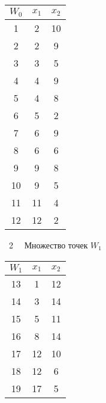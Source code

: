 \begin{multicols}{2}
{\small %
\begin{center}
\vspace*{3pt}
  \tabcolsep=17pt
  \begin{tabular}{|c|c|c|}
 \hline
   $ W_0$ & $x_1$ & $x_2$\\
   \hline
   \hphantom{9}1 & 2 &10\hphantom{9}\\
   \hphantom{9}2 & 2&9\\
   \hphantom{9}3 & 3&5\\
   \hphantom{9}4 & 4& 9\\
   \hphantom{9}5 & 4&8\\
   \hphantom{9}6 & 5&2\\
   \hphantom{9}7 & 6&9\\
   \hphantom{9}8 & 6&6\\
   \hphantom{9}9 & 9&8\\
   10 & 9&5\\
   11 & 11\hphantom{9}& 4\\
   12 &12\hphantom{9}&2 \\
\hline
\end{tabular}
\end{center}
}

\vspace*{6pt}

{ \begin{center}  %
 
\noindent
{{\tablename~2}\ \ \small{
Множество точек $W_1$
}}
\end{center}}

{\small %
\begin{center}
\vspace*{3pt}
  \tabcolsep=17pt
   \begin{tabular}{|c|c|c|}
 \hline
$W_1$ & $x_1$ & $x_2$\\
\hline
13 & \hphantom{9}1&12\\
14 & \hphantom{9}3& 14\\
15 & \hphantom{9}5& 11\\
16 & \hphantom{9}8&14\\
17 & 12&10\\
18 & 12& \hphantom{9}6\\
19 &17& \hphantom{9}5\\
\hline
\end{tabular}
\end{center}
}

\vspace*{6pt}


\end{multicols}
